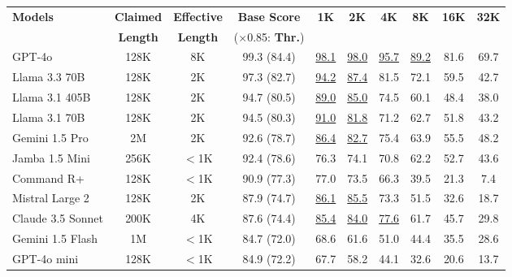 \begin{table*}[ht!]
        \small
	\setlength\tabcolsep{5pt}
	\centering
	\begin{tabular}{l|cc|ccccccc}
		\toprule
        \multirow{2}{*}{\textbf{Models}} & \textbf{Claimed} & \textbf{Effective} & \textbf{Base Score} & \multirow{2}{*}{\textbf{1K}} & \multirow{2}{*}{\textbf{2K}} & \multirow{2}{*}{\textbf{4K}} & \multirow{2}{*}{\textbf{8K}} & \multirow{2}{*}{\textbf{16K}} & \multirow{2}{*}{\textbf{32K}} \\
        & \textbf{Length} & \textbf{Length} & ($\times$0.85: \textbf{Thr.}) &&&&&& \\
        \midrule
        GPT-4o              & 128K & 8K & 99.3 (84.4) & \underline{98.1} & \underline{98.0} & \underline{95.7} & \underline{89.2} & 81.6 & 69.7 \\
        Llama 3.3 70B       & 128K & 2K & 97.3 (82.7) & \underline{94.2} & \underline{87.4} & 81.5 & 72.1 & 59.5 & \cellcolor[HTML]{faa7a7}42.7 \\
        Llama 3.1 405B      & 128K & 2K & 94.7 (80.5) & \underline{89.0} & \underline{85.0} & 74.5 & 60.1 & 48.4 & \cellcolor[HTML]{faa7a7}38.0 \\
        Llama 3.1 70B       & 128K & 2K & 94.5 (80.3) & \underline{91.0} & \underline{81.8} & 71.2 & 62.7 & 51.8 & \cellcolor[HTML]{faa7a7}43.2 \\
        Gemini 1.5 Pro      & 2M   & 2K & 92.6 (78.7) & \underline{86.4} & \underline{82.7} & 75.4 & 63.9 & 55.5 & 48.2 \\
        Jamba 1.5 Mini      & 256K & $<$1K & 92.4 (78.6) & 76.3 & 74.1 & 70.8 & 62.2 & 52.7 & \cellcolor[HTML]{faa7a7}43.6 \\
        Command R+          & 128K & $<$1K & 90.9 (77.3) & 77.0 & 73.5 & 66.3 & \cellcolor[HTML]{faa7a7}39.5 & \cellcolor[HTML]{faa7a7}21.3 & \cellcolor[HTML]{faa7a7}7.4 \\
        Mistral Large 2     & 128K & 2K & 87.9 (74.7) & \underline{86.1} & \underline{85.5} & 73.3 & 51.5 & \cellcolor[HTML]{faa7a7}32.6 & \cellcolor[HTML]{faa7a7}18.7 \\
        Claude 3.5 Sonnet   & 200K & 4K & 87.6 (74.4) & \underline{85.4} & \underline{84.0} & \underline{77.6} & 61.7 & 45.7 & \cellcolor[HTML]{faa7a7}29.8 \\
        Gemini 1.5 Flash    & 1M   & $<$1K & 84.7 (72.0) & 68.6 & 61.6 & 51.0 & 44.4 & \cellcolor[HTML]{faa7a7}35.5 & \cellcolor[HTML]{faa7a7}28.6 \\
        GPT-4o mini         & 128K & $<$1K & 84.9 (72.2) & 67.7 & 58.2 & 44.1 & \cellcolor[HTML]{faa7a7}32.6 & \cellcolor[HTML]{faa7a7}20.6 & \cellcolor[HTML]{faa7a7}13.7 \\

\end{tabular}
\end{table*}
